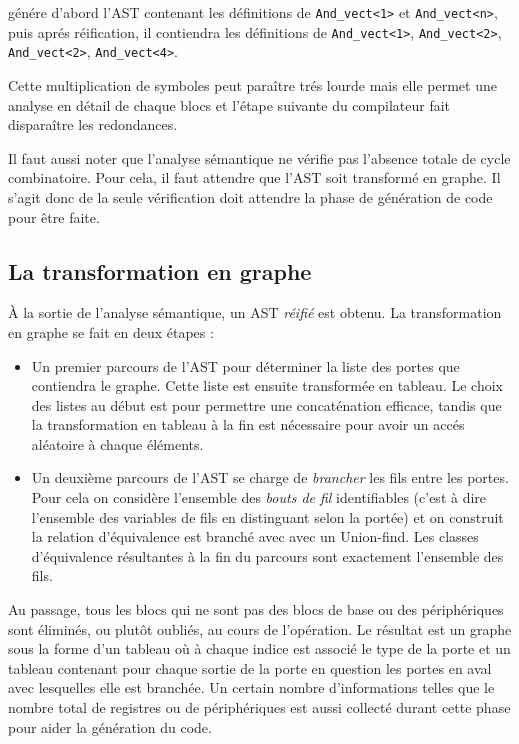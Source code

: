 \documentclass[13pt]{article}
\begin{document}
génére d'abord l'AST contenant les définitions de \texttt{And\_vect<1>} et
\texttt{And\_vect<n>}, puis aprés réification, il contiendra les définitions de
\texttt{And\_vect<1>}, \texttt{And\_vect<2>}, \texttt{And\_vect<2>},
\texttt{And\_vect<4>}. 

Cette multiplication de symboles peut paraître trés lourde mais elle permet une
analyse en détail de chaque blocs et l'étape suivante du compilateur fait
disparaître les redondances.

Il faut aussi noter que l'analyse sémantique ne vérifie pas l'absence totale de
cycle combinatoire. Pour cela, il faut attendre que l'AST soit transformé en
graphe. Il s'agit donc de la seule vérification doit attendre la phase de
génération de code pour être faite.

\subsection{La transformation en graphe}

À la sortie de l'analyse sémantique, un AST \emph{réifié} est obtenu. La
transformation en graphe se fait en deux étapes :
\begin{itemize}
\item Un premier parcours de l'AST pour déterminer la liste des portes
  que contiendra le graphe. Cette liste est ensuite transformée en tableau.
  Le choix des listes au début est pour permettre une concaténation efficace,
  tandis que la transformation en tableau à la fin est nécessaire pour avoir un
  accés aléatoire à chaque éléments.
\item Un deuxième parcours de l'AST se charge de \emph{brancher} les fils entre
  les portes. Pour cela on considère l'ensemble des \emph{bouts de fil} identifiables
  (c'est à dire l'ensemble des variables de fils en distinguant selon la portée)
  et on construit la relation d'équivalence \og est branché avec\fg{} avec un
  Union-find. Les classes d'équivalence résultantes à la fin du parcours sont
  exactement l'ensemble des fils.
\end{itemize}

Au passage, tous les blocs qui ne sont pas des blocs de base ou des
périphériques sont éliminés, ou plutôt oubliés, au cours de l'opération.
Le résultat est un graphe sous la forme d'un tableau où à chaque indice est
associé le type de la porte et un tableau contenant pour chaque sortie de la
porte en question les portes en aval avec lesquelles elle est branchée. Un
certain nombre d'informations telles que le nombre total de registres ou de
périphériques est aussi collecté durant cette phase pour aider la génération du code. 
\end{document}
